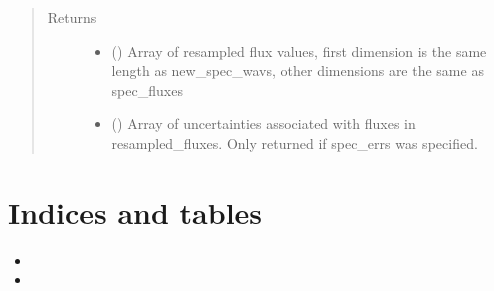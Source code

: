 \documentclass[a4paper,11pt,english]{sphinxmanual}
\begin{document}
\begin{fulllineitems}
\begin{quote}
\begin{description}
\begin{itemize}
\end{itemize}

\item[{Returns}] \leavevmode
\begin{itemize}
\item {} 
 () \textendash{} Array of resampled flux values, first dimension is the same length
as new\_spec\_wavs, other dimensions are the same as spec\_fluxes

\item {} 
 () \textendash{} Array of uncertainties associated with fluxes in resampled\_fluxes.
Only returned if spec\_errs was specified.

\end{itemize}


\end{description}\end{quote}

\end{fulllineitems}



\chapter{Indices and tables}
\label{\detokenize{index:indices-and-tables}}\begin{itemize}
\item {} 

\item {} 

\end{itemize}
\end{document}

